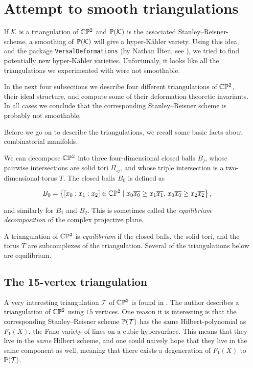 \section{Attempt to smooth triangulations}

If $\K$ is a triangulation of $\C \P^2$ and $\P(\K)$ is the associated Stanley--Reisner-scheme, a smoothing of $\P(\K)$ will give a hyper-Kähler variety. Using this idea, and the \MM package \texttt{VersalDeformations} (by Nathan Ilten, see \cite{ilten_versaldeformations}), we tried to find potentially new hyper-Kähler varieties. Unfortunaly, it looks like all the triangulations we experimented with were not smoothable.

In the next four subsections we describe four different triangulations of $\C \P^2$, their ideal structure, and compute some of their deformation theoretic invariants. In all cases we conclude that the corresponding Stanley--Reisner scheme is probably not smoothable.

Before we go on to describe the triangulations, we recall some basic facts about combinatorial manifolds.

We can decompose $\C \P^2$ into three four-dimensional closed balls $B_j$, whose pairwise intersections are solid tori $\Pi_{ij}$, and whose triple intersection is a two-dimensional torus $T$. The closed balls $B_0$ is defined as 

$$
B_0 = \left\{ [x_0:x_1:x_2] \in \C \P ^2 \mid x_0\overline{x_0} \geq x_1 \overline{x_1}, \,  x_0\overline{x_0} \geq x_2\overline{x_2} \right\},
$$

and similarly for $B_1$ and $B_2$. This is sometimes called the \emph{equilibrium decomposition} of the complex projective plane.

A triangulation of $\C \P^2$ is \emph{equilibrium} if the closed balls, the solid tori, and the torus $T$ are subcomplexes of the triangulation. Several of the triangulations below are equilibrium.

\subsection{The 15-vertex triangulation}

A very interesting triangulation $\mathcal T$ of $\C\P^2$ is found in \cite{cp2_15_chess}. The author describes a triangulation of $\C \P^2$ using $15$ vertices. One reason it is interesting is that the corresponding Stanley--Reisner scheme $\P(\mathcal T)$ has the same Hilbert-polynomial as $F_1(X)$, the Fano variety of lines on a cubic hypersurface. This means that they live in the \emph{same} Hilbert scheme, and one could naively hope that they live in the same component as well, meaning that there exists a degeneration of $F_1(X)$ to $\P(\mathcal T)$.


